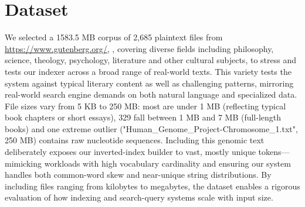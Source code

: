 \section{Dataset}
We selected a 1583.5 MB corpus of 2,685 plaintext files from \href{Project Gutenberg}{https://www.gutenberg.org/}, , covering diverse fields including philosophy, science, theology, psychology, literature and other cultural subjects, to stress and tests our indexer across a broad range of real-world texts. This variety tests the system against typical literary content as well as challenging patterns, mirroring real-world search engine demands on both natural language and specialized data. File sizes vary from 5 KB to 250 MB: most are under 1 MB (reflecting typical book chapters or short essays), 329 fall between 1 MB and 7 MB (full-length books) and one extreme outlier ("Human\_Genome\_Project-Chromosome\_1.txt", 250 MB) contains raw nucleotide sequences. Including this genomic text deliberately exposes our inverted-index builder to vast, mostly unique tokens—mimicking workloads with high vocabulary cardinality and ensuring our system handles both common-word skew and near-unique string distributions. By including files ranging from kilobytes to megabytes, the dataset enables a rigorous evaluation of how indexing and search-query systems scale with input size. 


